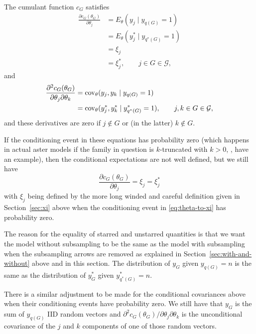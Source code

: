 The cumulant function $c_G$ satisfies
\begin{equation} \label{eq:theta-to-xi}
\begin{split}
   \frac{\partial c_G(\theta_G)}{\partial \theta_j}
   & =
   E_\theta(y_j \mid y_{q(G)} = 1)
   \\
   & =
   E_\theta(y^*_j \mid y_{q^*(G)} = 1)
   \\
   & =
   \xi_j
   \\
   & =
   \xi^*_j,
   \qquad j \in G \in \mathcal{G},
\end{split}
\end{equation}
and
\begin{equation} \label{eq:gamma-pre}
\begin{split}
   \frac{\partial^2 c_G(\theta_G)}{\partial \theta_j \partial \theta_k}
   & =
   \operatorname{cov}_\theta(y_j, y_k \mid y_{q(G)} = 1)
   \\
   & =
   \operatorname{cov}_\theta(y^*_j, y^*_k \mid y^*_{q^*(G)} = 1),
   \qquad j, k \in G \in \mathcal{G},
\end{split}
\end{equation}
and these derivatives are zero if $j \notin G$ or (in the latter)
$k \notin G$.

If the conditioning event in these equations has probability
zero (which happens in actual aster models if the family in question is
$k$-truncated with $k > 0$, \citealp{aster2}, have an example), then the
conditional expectations are not well defined, but we still have
\begin{equation} \label{eq:xi-from-c}
   \frac{\partial c_G(\theta_G)}{\partial \theta_j}
   =
   \xi_j
   =
   \xi^*_j
\end{equation}
with $\xi_j$ being defined by the more long winded and careful
definition given in Section~\ref{sec:xi} above when the conditioning
event in \eqref{eq:theta-to-xi} has probability zero.

The reason for the equality of starred and unstarred quantities is that
we want the model without subsampling to be the same as the model
with subsampling when the subsampling arrows are removed as explained
in Section~\ref{sec:with-and-without} above and in this section.
The distribution of $y_G$ given $y_{q(G)} = n$ is the same as
the distribution of $y^*_G$ given $y^*_{q^*(G)} = n$.

There is a similar adjustment to be made for the conditional covariances above
when their conditioning events have probability zero.
We still have that $y_G$ is the sum of $y_{q(G)}$ IID random vectors
and $\partial^2 c_G(\theta_G) / \partial \theta_j \partial \theta_k$
is the unconditional covariance of the $j$ and $k$ components of one
of those random vectors.

